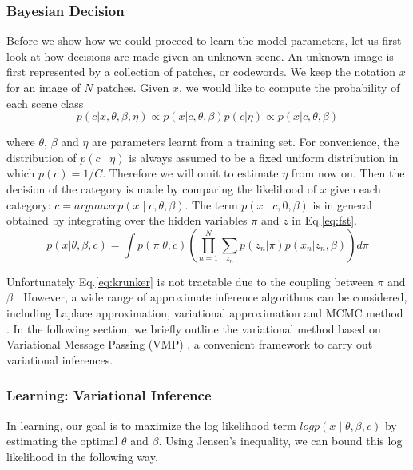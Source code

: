 \documentclass[10pt,a4paper,twocolumn]{article}
\begin{document}
\subsubsection{ Bayesian Decision}
Before we show how we could proceed to learn the model parameters, let us first look at how decisions are made given an unknown scene. An unknown image is first represented by a collection of patches, or codewords. We keep the notation $x$ for an image of $N$ patches. Given $x$, we would like to compute the probability of each scene class
\begin{equation}
p(c\vert x, \theta, \beta, \eta)\propto p(x\vert c, \theta, \beta)p(c\vert \eta)\propto p(x\vert c, \theta, \beta)
\end{equation}

where $\theta$, $\beta$ and $\eta$ are parameters learnt from a training set. For convenience, the distribution of $p(c\mid\eta)$ is always assumed to be a fixed uniform distribution in which $p(c)=1/C$. Therefore we will omit to estimate $\eta$ from now on. Then the decision of the category is made by comparing the likelihood of $x$ given each category: $c= arg max cp(x\mid c,\theta,\beta)$. The term $p(x\mid c,0,\beta)$ is in general obtained by integrating over the hidden variables $\pi$ and $z$ in Eq.\ref{eq:fst}.
\begin{equation} \label{eq:krunker}
p(x\vert \theta, \beta, c)=\int p(\pi\vert \theta, c)\left(\prod_{n=1}^{N}\sum_{z_{n}}p(z_{n}\vert \pi)p(x_{n}\vert z_{n}, \beta)\right)d\pi
\end{equation}

Unfortunately Eq.\ref{eq:krunker} is not tractable due to the coupling between $\pi$ and $\beta$ \cite{blei}. However, a wide range of approximate inference algorithms can be considered, including Laplace approximation, variational approximation and MCMC method \cite{blei}. In the following section, we briefly outline the variational method based on Variational Message Passing (VMP) \cite{winn}, a convenient framework to carry out variational inferences.

\subsubsection{Learning: Variational Inference}
In learning, our goal is to maximize the log likelihood term $logp(x\mid\theta, \beta, c)$ by estimating the optimal $\theta$ and $\beta$. Using Jensen's inequality, we can bound this log likelihood in the following way.
\end{document}
